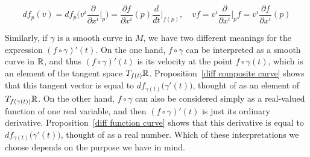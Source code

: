 \[df_p(v)=df_p\Big(v^i\frac{\partial}{\partial x^i}\Big|_p\Big)=\frac{\partial f}{\partial x^i}(p)\frac{d}{dt}\Big|_{f(p)},\quad vf=v^i\frac{\partial}{\partial x^i}\Big|_pf=v^i\frac{\partial f}{\partial x^i}(p)\]\par
Similarly, if $\gamma$ is a smooth curve in $M$, we have two different meanings for the expression $(f\circ\gamma)'(t)$. On the one hand, $f\circ\gamma$ can be interpreted as a smooth curve in $\mathbb{R}$, and thus $(f\circ\gamma)'(t)$ is its velocity at the point $f\circ\gamma(t)$, which is an element of the tangent space $T_{f(t)}\mathbb{R}$. Proposition~\ref{diff composite curve} shows that this tangent vector is equal to $df_{\gamma(t)}\big(\gamma'(t)\big)$, thought of as an element of $T_{f(\gamma(t))}\mathbb{R}$. On the other hand, $f\circ\gamma$ can
also be considered simply as a real-valued function of one real variable, and then $(f\circ\gamma)'(t)$ is just its ordinary derivative. Proposition~\ref{diff function curve} shows that this derivative is equal to $df_{\gamma(t)}\big(\gamma'(t)\big)$, thought of as a real number. Which of these interpretations we choose depends on the purpose we have in mind.
